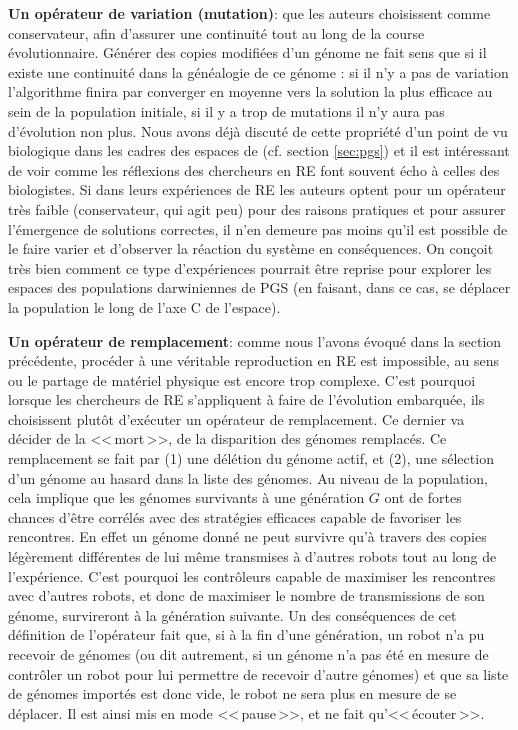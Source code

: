 \textbf{Un opérateur de variation (mutation)}: que les auteurs choisissent comme conservateur, afin d'assurer une continuité tout au long de la course évolutionnaire. Générer des copies modifiées d'un génome ne fait sens que si il existe une continuité dans la généalogie de ce génome : si il n'y a pas de variation l'algorithme finira par converger en moyenne vers la solution la plus efficace au sein de la population initiale, si il y a trop de mutations il n'y aura pas d'évolution non plus. Nous avons déjà discuté de cette propriété d'un point de vu biologique dans les cadres des espaces de \cite{godfrey2009darwinian} (cf. section \ref{sec:pgs}) et il est intéressant de voir comme les réflexions des chercheurs en RE font souvent écho à celles des biologistes. Si dans leurs expériences de RE les auteurs optent pour un opérateur très faible (conservateur, qui agit peu) pour des raisons pratiques et pour assurer l'émergence de solutions correctes, il n'en demeure pas moins qu'il est possible de le faire varier et d'observer la réaction du système en conséquences. On conçoit très bien comment ce type d'expériences pourrait être reprise pour explorer les espaces des populations darwiniennes de PGS (en faisant, dans ce cas, se déplacer la population le long de l'axe C de l'espace).

\textbf{Un opérateur de remplacement}: comme nous l'avons évoqué dans la section précédente, procéder à une véritable reproduction en RE est impossible, au sens ou le partage de matériel physique est encore trop complexe. C'est pourquoi lorsque les chercheurs de RE s'appliquent à faire de l'évolution embarquée, ils choisissent plutôt d'exécuter un opérateur de remplacement. Ce dernier va décider de la <<\,mort\,>>, de la disparition des génomes remplacés. Ce remplacement se fait par (1) une délétion du génome actif, et (2), une sélection d'un génome au hasard dans la liste des génomes. Au niveau de la population, cela implique que les génomes survivants à une génération $G$ ont de fortes chances d'être corrélés avec des stratégies efficaces capable de favoriser les rencontres. En effet un génome donné ne peut survivre qu'à travers des copies légèrement différentes de lui même transmises à d'autres robots tout au long de l'expérience. C'est pourquoi les contrôleurs capable de maximiser les rencontres avec d'autres robots, et donc de maximiser le nombre de transmissions de son génome, survireront à la génération suivante. Un des conséquences de cet définition de l'opérateur fait que, si à la fin d'une génération, un robot n'a pu recevoir de génomes (ou dit autrement, si un génome n'a pas été en mesure de contrôler un robot pour lui permettre de recevoir d'autre génomes) et que  sa liste de génomes importés est donc vide, le robot ne sera plus en mesure de se déplacer. Il est ainsi mis en mode <<\,pause\,>>, et ne fait qu'<<\,écouter\,>>.

